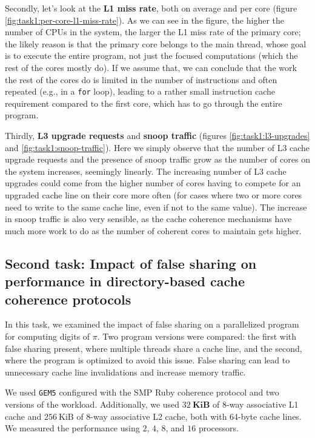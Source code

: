 \documentclass[10pt]{article}
\begin{document}
Secondly, let's look at the \textbf{L1 miss rate}, both on average and per core (figure \ref{fig:task1:per-core-l1-miss-rate}). As we can see in the figure, the higher the number of CPUs in the system, the larger the L1 miss rate of the primary core; the likely reason is that the primary core belongs to the main thread, whose goal is to execute the entire program, not just the focused computations (which the rest of the cores mostly do). If we assume that, we can conclude that the work the rest of the cores do is limited in the number of instructions and often repeated (e.g., in a \texttt{for} loop), leading to a rather small instruction cache requirement compared to the first core, which has to go through the entire program.

Thirdly, \textbf{L3 upgrade requests} and \textbf{snoop traffic} (figures \ref{fig:task1:l3-upgrades} and \ref{fig:task1:snoop-traffic}). Here we simply observe that the number of L3 cache upgrade requests and the presence of snoop traffic grow as the number of cores on the system increases, seemingly linearly. The increasing number of L3 cache upgrades could come from the higher number of cores having to compete for an upgraded cache line on their core more often (for cases where two or more cores need to write to the same cache line, even if not to the same value). The increase in snoop traffic is also very sensible, as the cache coherence mechanisms have much more work to do as the number of coherent cores to maintain gets higher.


\subsection{Second task: Impact of false sharing on performance in directory-based cache coherence protocols}
In this task, we examined the impact of false sharing on a parallelized program for computing digits of $\pi$. Two program versions were compared: the first with false sharing present, where multiple threads share a cache line, and the second, where the program is optimized to avoid this issue. False sharing can lead to unnecessary cache line invalidations and increase memory traffic.

We used \texttt{GEM5} configured with the SMP Ruby coherence protocol and two versions of the workload. Additionally, we used $32~\textbf{KiB}$ of 8-way associative L1 cache and $256~\text{KiB}$ of 8-way associative L2 cache, both with 64-byte cache lines. We measured the performance using $2$, $4$, $8$, and $16$ processors.
\end{document}
